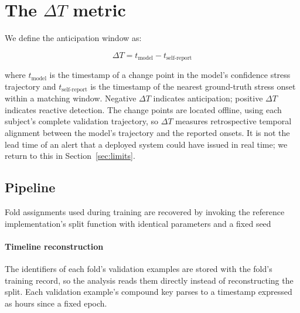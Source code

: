 \documentclass[preprint,12pt,authoryear]{elsarticle}
\newcommand{\dt}{$\Delta T$}
\providecommand{\DIFaddtex}[1]{{\protect\color{blue} \sf #1}} %
\providecommand{\DIFdeltex}[1]{{\protect\color{red} \scriptsize #1}} %
\providecommand{\DIFaddbegin}{} %
\providecommand{\DIFaddend}{} %
\providecommand{\DIFdelbegin}{} %
\providecommand{\DIFdelend}{} %
\providecommand{\DIFadd}[1]{\texorpdfstring{\DIFaddtex{#1}}{#1}} %
\providecommand{\DIFdel}[1]{\texorpdfstring{\DIFdeltex{#1}}{}} %
\newcommand{\DIFscaledelfig}{0.5}
\newlength{\DIFdelgraphicswidth} %
\newlength{\DIFdelgraphicsheight} %
\newcommand{\DIFaddincludegraphics}[2][]{{\color{blue}\fbox{\DIFOincludegraphics[#1]{#2}}}} %
\newcommand{\DIFdelincludegraphics}[2][]{%
\sbox{\DIFdelgraphicsbox}{\DIFOincludegraphics[#1]{#2}}%
\settoboxwidth{\DIFdelgraphicswidth}{\DIFdelgraphicsbox} %
\settoboxtotalheight{\DIFdelgraphicsheight}{\DIFdelgraphicsbox} %
\scalebox{\DIFscaledelfig}{%
\parbox[b]{\DIFdelgraphicswidth}{\usebox{\DIFdelgraphicsbox}\\[-\baselineskip] \rule{\DIFdelgraphicswidth}{0em}}\llap{\resizebox{\DIFdelgraphicswidth}{\DIFdelgraphicsheight}{%
\setlength{\unitlength}{\DIFdelgraphicswidth}%
\begin{picture}(1,1)%
\thicklines\linethickness{2pt} %
{\color[rgb]{1,0,0}\put(0,0){\framebox(1,1){}}}%
{\color[rgb]{1,0,0}\put(0,0){\line( 1,1){1}}}%
{\color[rgb]{1,0,0}\put(0,1){\line(1,-1){1}}}%
\end{picture}%
}\hspace*{3pt}}} %
} %
\DeclareRobustCommand{\DIFaddbegin}{\DIFOaddbegin \let\includegraphics\DIFaddincludegraphics} %
\DeclareRobustCommand{\DIFaddend}{\DIFOaddend \let\includegraphics\DIFOincludegraphics} %
\DeclareRobustCommand{\DIFdelbegin}{\DIFOdelbegin \let\includegraphics\DIFdelincludegraphics} %
\DeclareRobustCommand{\DIFdelend}{\DIFOaddend \let\includegraphics\DIFOincludegraphics} %
\begin{document}
\section{The \dt{} metric}
\DIFaddbegin \label{sec:dt}
\DIFaddend %

We define the anticipation window as:

\begin{equation}
\Delta T = t_{\mathrm{model}} - t_{\mathrm{self\text{-}report}}
\label{eq:dt}
\end{equation}

where $t_{\mathrm{model}}$ is the timestamp of a change point in the
model's \DIFdelbegin \DIFdel{confidence }\DIFdelend \DIFaddbegin \DIFadd{stress }\DIFaddend trajectory and $t_{\mathrm{self\text{-}report}}$ is
the timestamp of the nearest ground-truth stress onset within a matching
window. Negative \dt{} indicates anticipation; positive \dt{} indicates
reactive detection. \DIFaddbegin \DIFadd{The change points are located offline, using each
subject's complete validation trajectory, so \dt{} measures
retrospective temporal alignment between the model's trajectory and the
reported onsets. It is not the lead time of an alert that a deployed
system could have issued in real time; we return to this in
Section~\ref{sec:limits}.
}\DIFaddend 

\subsection{Pipeline}

\DIFdelbegin %
\DIFdel{Fold assignments used during
training are recovered by invoking the reference implementation's split
function with identical parameters and a fixed seed}\DIFdelend \DIFaddbegin \paragraph{Timeline reconstruction} \DIFadd{The identifiers of each fold's
validation examples are stored with the fold's training record, so the
analysis reads them directly instead of reconstructing the split}\DIFaddend . Each
validation
example's compound key parses to a timestamp expressed as hours since a
fixed epoch.
\end{document}
